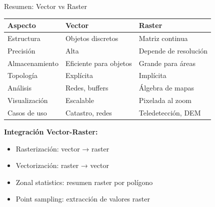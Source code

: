 \documentclass[10pt,aspectratio=169]{beamer}
\begin{document}
\begin{frame}{Resumen: Vector vs Raster}
    \begin{center}
    \begin{table}
        \footnotesize
        \begin{tabular}{lll}
        \toprule
        \textbf{Aspecto} & \textbf{Vector} & \textbf{Raster} \\
        \midrule
        Estructura & Objetos discretos & Matriz continua \\
        Precisión & Alta & Depende de resolución \\
        Almacenamiento & Eficiente para objetos & Grande para áreas \\
        Topología & Explícita & Implícita \\
        Análisis & Redes, buffers & Álgebra de mapas \\
        Visualización & Escalable & Pixelada al zoom \\
        Casos de uso & Catastro, redes & Teledetección, DEM \\
        \bottomrule
        \end{tabular}
    \end{table}
    \end{center}
    
    \vspace{0.3cm}
    
    \begin{tcolorbox}[colframe=usachblue,colback=blue!5]
        \footnotesize
        \textbf{Integración Vector-Raster:}
        \begin{itemize}
            \item Rasterización: vector → raster
            \item Vectorización: raster → vector
            \item Zonal statistics: resumen raster por polígono
            \item Point sampling: extracción de valores raster
        \end{itemize}
    \end{tcolorbox}
\end{frame}
\end{document}
